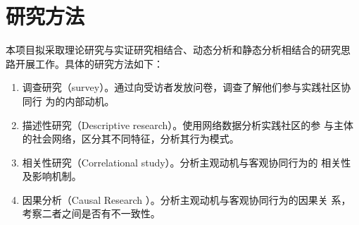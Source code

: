 \documentclass[12pt,a4paper]{ctexart}
\begin{document}
\section{研究方法}
本项目拟采取理论研究与实证研究相结合、动态分析和静态分析相结合的研究思
路开展工作。具体的研究方法如下：
\begin{enumerate}
\item  调查研究（survey）。通过向受访者发放问卷，调查了解他们参与实践社区协同行
  为的内部动机。
\item 描述性研究（Descriptive research）。使用网络数据分析实践社区的参
  与主体的社会网络，区分其不同特征，分析其行为模式。
\item 相关性研究（Correlational study）。分析主观动机与客观协同行为的
  相关性及影响机制。
\item 因果分析（Causal Research ）。分析主观动机与客观协同行为的因果关
  系，考察二者之间是否有不一致性。
\end{enumerate}
\end{document}
